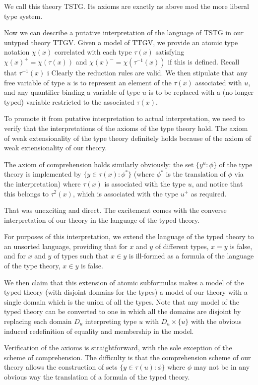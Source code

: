 \documentclass[12pt]{article}
\begin{document}
We call this theory TSTG.  Its axioms are exactly as above mod the more liberal type system.

Now we can describe a putative interpretation of the language of TSTG  in our untyped theory  TTGV.  Given a model of TTGV, we provide an atomic type notation $\chi(x)$ correlated with each type $\tau(x)$ satisfying $\chi(x)^+=\chi(\tau(x))$ and $\chi(x)^- = \chi(\tau^{-1}(x))$ if this is defined.   Recall that $\tau^{-1}(x)$ i
Clearly the reduction rules are valid.  We then stipulate that any free variable of type $u$ is to represent an element of the $\tau(x)$ associated with $u$, and any quantifier binding a variable of type $u$ is to be replaced with a (no longer typed) variable restricted to the associated $\tau(x)$.

To promote it from putative interpretation to actual interpretation, we need to verify that the interpretations of the axioms of the type theory hold.  The axiom of weak extensionality of the type theory definitely holds because of the axiom of weak extensionality of our theory.

The axiom of comprehension holds similarly obviously:  the set $\{y^u:\phi\}$ of the type theory is implemented by $\{y \in \tau(x):\phi^*\}$ (where $\phi^*$ is the translation of $\phi$ via the interpretation) where $\tau(x)$ is associated with the type $u$, and notice that this belongs to $\tau^2(x)$, which is associated with the type $u^+$ as required.

That was unexciting and direct.  The excitement comes with the converse interpretation of our theory in the language of the typed theory.

For purposes of this interpretation, we extend the language of the typed theory to an unsorted language, providing that for $x$ and $y$ of different types, $x=y$ is false, and for $x$ and $y$ of types such that $x \in y$ is ill-formed as a formula of the language of the type theory, $x \in y$ is false.

We then claim that this extension of atomic subformulas makes a model of the typed theory (with disjoint domains for the types) a model of our theory with a single domain which is the union of all the types.  Note that any model of the typed theory can be converted to one in which all the domains are disjoint
by replacing each domain $D_u$ interpreting type $u$ with $D_u \times \{u\}$ with the obvious induced redefinition of equality and membership in the model.

Verification of the axioms is straightforward, with the sole exception of the scheme of comprehension.  The difficulty is that the comprehension scheme of our theory allows the construction of sets $\{y \in \tau(u):\phi\}$ where $\phi$ may not be in any obvious way the translation of a formula of the typed theory.
\end{document}
